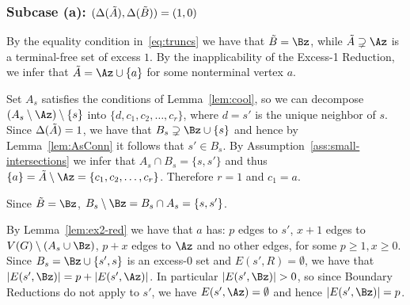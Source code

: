 \subsubsection{Subcase (a): $(\Delta(\tilde{A}),\Delta(\tilde{B}))=(1,0)$}

By the equality condition in~\eqref{eq:truncs} we have that $\Btr=\Bz$, while $\Atr\supsetneq \Az$ is a terminal-free set of excess $1$. By the inapplicability of the Excess-1 Reduction, we infer that $\Atr=\Az\cup \{a\}$ for some nonterminal vertex $a$.





Set $A_s$ satisfies the conditions of Lemma~\ref{lem:cool}, so we can decompose $(A_s\setminus \Az)\setminus \{s\}$ into $\{d,c_1,c_2,\ldots,c_r\}$, where $d=s'$ is the unique neighbor of $s$. Since $\Delta(\tilde{A})=1$, we have that $B_s\supsetneq \Bz\cup \{s\}$ and hence by Lemma~\ref{lem:AsConn} it follows that $s'\in B_s$. By Assumption~\ref{ass:small-intersections} we infer that $A_s\cap B_s=\{s,s'\}$ and thus $\{a\}=\Atr\setminus \Az=\{c_1,c_2,\ldots,c_r\}$. Therefore $r=1$ and $c_1=a$.

Since $\Btr=\Bz$, $B_s\setminus \Bz = B_s \cap A_s = \{s,s'\}$.

By Lemma~\ref{lem:ex2-red} we have that $a$ has: $p$ edges to $s'$, $x+1$ edges to $V(G)\setminus (A_s \cup \Bz)$, $p+x$ edges to $\Az$ and no other edges, for some $p\geq 1, x\geq 0$. 
Since $B_s=\Bz\cup \{s',s\}$ is an excess-0 set and $E(s',R)=\emptyset$, we have that $|E(s',\Bz)|=p+|E(s',\Az)|$. In particular $|E(s',\Bz)|>0$, so since Boundary Reductions do not apply to $s'$, we have $E(s',\Az)=\emptyset$ and hence $|E(s',\Bz)|=p$.

